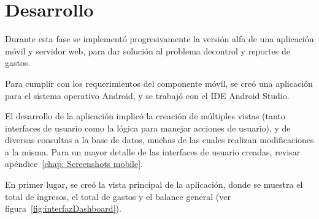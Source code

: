 \section{Desarrollo} \label{sect:desarrollo}

Durante esta fase se implementó progresivamente la versión alfa de una aplicación móvil y servidor web, para dar solución al problema decontrol y reportes de gastos. 

Para cumplir con los requerimientos del componente móvil, se creó una aplicación para el sistema operativo Android, y se trabajó con el IDE Android Studio. 

El desarrollo de la aplicación implicó la creación de múltiples vistas (tanto interfaces de usuario como la lógica para manejar acciones de usuario), y de diversas consultas a la base de datos, muchas de las cuales realizan modificaciones a la misma. Para un mayor detalle de las interfaces de usuario creadas, revisar apéndice~\ref{chap: Screenshots mobile}.

En primer lugar, se creó la vista principal de la aplicación, donde se muestra el total de ingresos, el total de gastos y el balance general (ver figura~\ref{fig:interfazDashboard}).


